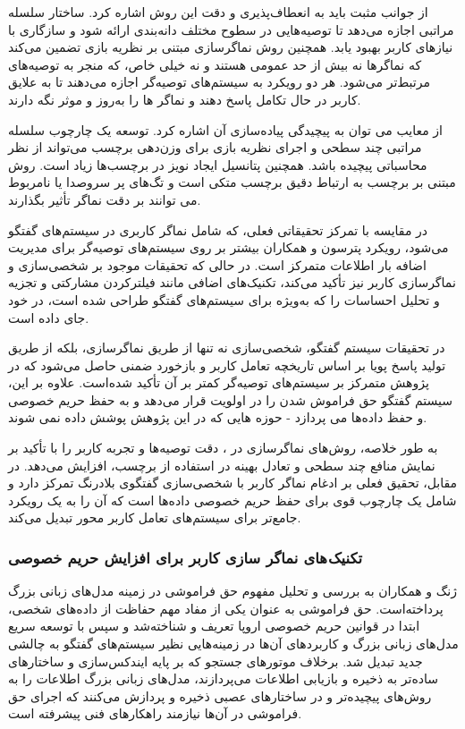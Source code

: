 از جوانب مثبت%
\cite{peterson2021user}
 باید به انعطاف‌پذیری و دقت این روش اشاره کرد. ساختار سلسله مراتبی اجازه می‌دهد تا توصیه‌هایی در سطوح مختلف دانه‌بندی ارائه شود و سازگاری با نیازهای کاربر بهبود یابد. همچنین روش نماگر‌سازی مبتنی بر نظریه بازی تضمین می‌کند که نماگر‌ها نه بیش از حد عمومی هستند و نه خیلی خاص، که منجر به توصیه‌های مرتبط‌تر می‌شود. هر دو رویکرد به سیستم‌های توصیه‌گر اجازه می‌دهند تا به علایق کاربر در حال تکامل پاسخ دهند و نماگر ها را به‌روز و موثر نگه دارند.

از معایب 
\cite{peterson2021user}
 می توان به پیچیدگی پیاده‌سازی آن اشاره کرد. توسعه یک چارچوب سلسله مراتبی چند سطحی و اجرای نظریه بازی برای وزن‌دهی برچسب می‌تواند از نظر محاسباتی پیچیده باشد. همچنین پتانسیل ایجاد نویز در برچسب‌ها زیاد است. روش مبتنی بر برچسب به ارتباط دقیق برچسب متکی است و تگ‌های پر سروصدا یا نامربوط می توانند بر دقت نماگر تأثیر بگذارند.

در مقایسه با تمرکز تحقیقاتی فعلی، که شامل نماگر کاربری در سیستم‌های گفتگو می‌شود، رویکرد پترسون و همکاران بیشتر بر روی سیستم‌های توصیه‌گر برای مدیریت اضافه بار اطلاعات متمرکز است. در حالی که تحقیقات موجود بر شخصی‌سازی و نماگر‌سازی کاربر نیز تأکید می‌کند، تکنیک‌های اضافی مانند فیلترکردن مشارکتی و تجزیه و تحلیل احساسات را که به‌ویژه برای سیستم‌های گفتگو طراحی شده است، در خود جای داده است.

در تحقیقات سیستم گفتگو، شخصی‌سازی نه تنها از طریق نماگر‌سازی، بلکه از طریق تولید پاسخ پویا بر اساس تاریخچه تعامل کاربر و بازخورد ضمنی حاصل می‌شود که در پژوهش متمرکز بر سیستم‌های توصیه‌گر کمتر بر آن تأکید شده‌است. علاوه بر این، سیستم گفتگو حق فراموش شدن را در اولویت قرار می‌دهد و به حفظ حریم خصوصی و حفظ داده‌ها می پردازد - حوزه هایی که در این پژوهش پوشش داده نمی شوند.

به طور خلاصه، روش‌های نماگر‌سازی در 
\cite{peterson2021user}
، دقت توصیه‌ها و تجربه کاربر را با تأکید بر نمایش منافع چند سطحی و تعادل بهینه در استفاده از برچسب، افزایش می‌دهد. در مقابل، تحقیق فعلی بر ادغام نماگر کاربر با شخصی‌سازی گفتگوی بلادرنگ تمرکز دارد و شامل یک چارچوب قوی برای حفظ حریم خصوصی داده‌ها است که آن را به یک رویکرد جامع‌تر برای سیستم‌های تعامل کاربر محور تبدیل می‌کند.

\subsubsection{تکنیک های نماگر سازی کاربر برای افزایش حریم خصوصی}
ژنگ و همکاران %
\cite{zhang2024right}
  به بررسی و تحلیل مفهوم حق فراموشی در زمینه مدل‌های زبانی بزرگ پرداخته‌است. حق فراموشی به عنوان یکی از مفاد مهم حفاظت از داده‌های شخصی، ابتدا در قوانین حریم خصوصی اروپا%
 تعریف و شناخته‌شد و سپس با توسعه سریع مدل‌های زبانی بزرگ و کاربردهای آن‌ها در زمینه‌هایی نظیر سیستم‌های گفتگو به چالشی جدید تبدیل شد. برخلاف موتورهای جستجو که بر پایه ایندکس‌سازی و ساختارهای ساده‌تر به ذخیره و بازیابی اطلاعات می‌پردازند، مدل‌های زبانی بزرگ اطلاعات را به روش‌های پیچیده‌تر و در ساختارهای عصبی ذخیره و پردازش می‌کنند که اجرای حق فراموشی در آن‌ها نیازمند راهکارهای فنی پیشرفته است.

